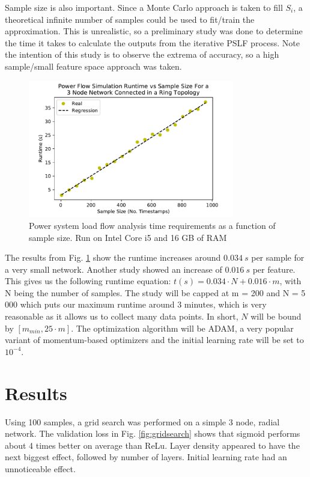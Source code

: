 \documentclass[conference]{IEEEtran}
\begin{document}
Sample size is also important. Since a Monte Carlo approach is taken to fill $S_{i}$, a theoretical infinite number of samples could be used to fit/train the approximation. This is unrealistic, so a preliminary study was done to determine the time it takes to calculate the outputs from the iterative PSLF process. Note the intention of this study is to observe the extrema of accuracy, so a high sample/small feature space approach was taken.

\begin{figure}[h]
	\centering
	\includegraphics[width=9cm]{pslfruntimevssamples.pdf}
	\caption{Power system load flow analysis time requirements as a function of sample size. Run on Intel Core i5 and 16 GB of RAM}
	\label{fig:pslfruntime}
\end{figure}

The results from Fig. \ref{fig:pslfruntime} show the runtime increases around $0.034~s$ per sample for a very small network. Another study showed an increase of $0.016~s$ per feature. This gives us the following runtime equation: $t(s) = 0.034\cdot N + 0.016\cdot m$, with N being the number of samples. The study will be capped at m = 200 and N = 5 000 which puts our maximum runtime around 3 minutes, which is very reasonable as it allows us to collect many data points. In short, $N$ will be bound by $[m_{min}, 25\cdot m]$. The optimization algorithm will be ADAM, a very popular variant of momentum-based optimizers and the initial learning rate will be set to $10^{-4}$.
 
\section{Results}
\label{sec:results}

Using 100 samples, a grid search was performed on a simple 3 node, radial network. The validation loss in Fig. \ref{fig:gridsearch} shows that sigmoid performs about 4 times better on average than ReLu. Layer density appeared to have the next biggest effect, followed by number of layers. Initial learning rate had an unnoticeable effect.
\end{document}
